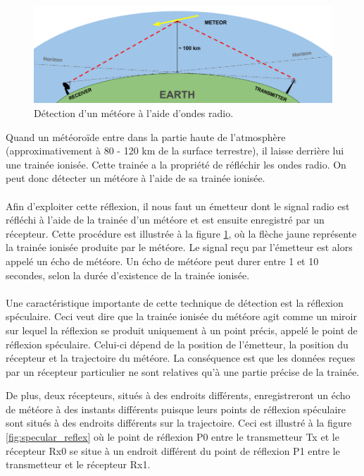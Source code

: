 \documentclass[11pt]{article}
\begin{document}
\begin{figure}[t]
    \begin{center}
        \includegraphics[scale=0.37]{ForwardScatter_principle.png}
        \caption{Détection d'un météore à l'aide d'ondes radio.}
        \label{fig:forward_scatt}
    \end{center}
\end{figure}

Quand un météoroïde entre dans la partie haute de l'atmosphère (approximativement à 80 - 120 km de la surface terrestre), il laisse derrière lui une trainée ionisée.
Cette trainée a la propriété de réfléchir les ondes radio.
On peut donc détecter un météore à l'aide de sa trainée ionisée.
\\
\\
Afin d'exploiter cette réflexion, il nous faut un émetteur dont le signal radio est réfléchi à l'aide de la trainée d'un météore et est ensuite enregistré par un récepteur.
Cette procédure est illustrée à la figure \ref{fig:forward_scatt}, où la flèche jaune représente la trainée ionisée produite par le météore.
Le signal reçu par l'émetteur est alors appelé un écho de météore.
Un écho de météore peut durer entre 1 et 10 secondes, selon la durée d'existence de la trainée ionisée.
\\
\\
Une caractéristique importante de cette technique de détection est la réflexion spéculaire.
Ceci veut dire que la trainée ionisée du météore agit comme un miroir sur lequel la réflexion se produit uniquement à un point précis, appelé le point de réflexion spéculaire.
Celui-ci dépend de la position de l'émetteur, la position du récepteur et la trajectoire du météore.
La conséquence est que les données reçues par un récepteur particulier ne sont relatives qu'à une partie précise de la trainée.

\newpage

De plus, deux récepteurs, situés à des endroits différents, enregistreront un écho de météore à des instants différents puisque leurs points de réflexion spéculaire sont situés à des endroits différents sur la trajectoire.
Ceci est illustré à la figure \ref{fig:specular_reflex} où le point de réflexion P0 entre le transmetteur Tx et le récepteur Rx0 se situe à un endroit différent du point de réflexion P1 entre le transmetteur et le récepteur Rx1.
\end{document}
